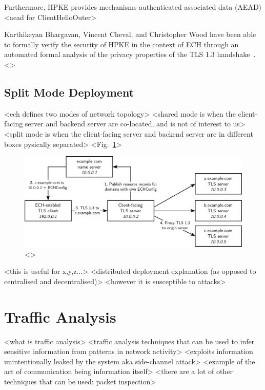 Furthermore, HPKE provides mechanisms authenticated associated data (AEAD) <aead for ClientHelloOuter>

Karthikeyan Bhargavan, Vincent Cheval, and Christopher Wood have been able to formally verify the security of HPKE in the context of ECH through an automated formal analysis of the privacy properties of the TLS 1.3 handshake~\cite{bhargavan2022symbolic}. <>

\subsection{Split Mode Deployment}

<ech defines two modes of network topology>
<shared mode is when the client-facing server and backend server are co-located, and is not of interest to us>
<split mode is when the client-facing server and backend server are in different boxes pysically separated>
<Fig.~\ref{ech_split_mode_figure}>

\begin{figure}[ht]
\centerline{\includegraphics[width=160mm]{images/ech-split-mode.png}}
\caption[Example ECH Split Mode deployment]{<>}
\label{ech_split_mode_figure}
\end{figure}

<this is useful for x,y,z...>
<distributed deployment explanation (as opposed to centralised and decentralised)>
<however it is susceptible to attacks>







\section{Traffic Analysis}

<what is traffic analysis>
<traffic analysis techniques that can be used to infer sensitive information from patterns in network activity>
<exploits information unintentionally leaked by the system aka side-channel attack>
<example of the act of communication being information itself>
<there are a lot of other techniques that can be used: packet inspection>

